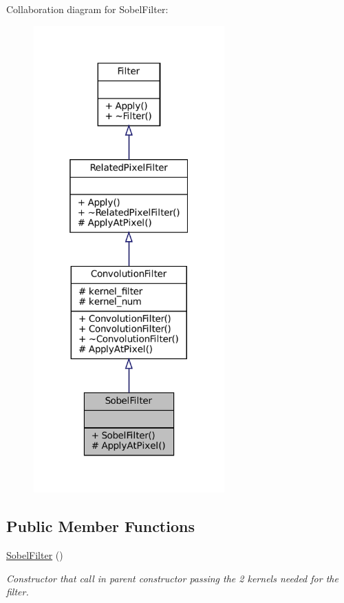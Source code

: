 Collaboration diagram for Sobel\+Filter\+:\nopagebreak
\begin{figure}[H]
\begin{center}
\leavevmode
\includegraphics[width=208pt]{classSobelFilter__coll__graph}
\end{center}
\end{figure}
\subsection*{Public Member Functions}
\begin{DoxyCompactItemize}
\item 
\mbox{\label{classSobelFilter_ae46218b3594451a1b5fbdf0ebbd7c688}} 
\hyperlink{classSobelFilter_ae46218b3594451a1b5fbdf0ebbd7c688}{Sobel\+Filter} ()
\begin{DoxyCompactList}\small\item\em Constructor that call in parent constructor passing the 2 kernels needed for the filter. \end{DoxyCompactList}\end{DoxyCompactItemize}
